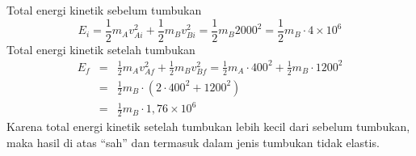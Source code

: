 \documentclass[11pt,fleqn, a4paper]{exam}
\begin{document}
\begin{questions}
Total energi kinetik sebelum tumbukan
\begin{equation*}
E_{i} = \frac{1}{2} m_A v_{Ai}^2 + \frac{1}{2} m_B v_{Bi}^2 = \frac{1}{2} m_B 2000^2 = \frac{1}{2} m_B \cdot 4 \times 10^6
\end{equation*}
Total energi kinetik setelah tumbukan
\begin{eqnarray*}
E_{f} &=& \frac{1}{2} m_A v_{Af}^2 + \frac{1}{2} m_B v_{Bf}^2 = \frac{1}{2} m_A \cdot 400^2 + \frac{1}{2} m_B \cdot 1200^2\\ 
&=& \frac{1}{2} m_B \cdot (2 \cdot 400^2 + 1200^2)\\
&=& \frac{1}{2} m_B \cdot 1,76 \times 10^6
\end{eqnarray*}
Karena total energi kinetik setelah tumbukan lebih kecil dari sebelum tumbukan, maka hasil di atas ``sah'' dan termasuk dalam jenis tumbukan tidak elastis.




\end{questions}
\end{document}
